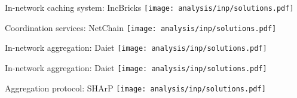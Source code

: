 \begin{frame}{In-network caching system: IncBricks}
    \centering
    \texttt{[image: analysis/inp/solutions.pdf]}
\end{frame}

\begin{frame}{Coordination services: NetChain}
    \centering
    \texttt{[image: analysis/inp/solutions.pdf]}
\end{frame}

\begin{frame}{In-network aggregation: Daiet}
    \centering
    \texttt{[image: analysis/inp/solutions.pdf]}
\end{frame}

\begin{frame}{In-network aggregation: Daiet}
    \centering
    \texttt{[image: analysis/inp/solutions.pdf]}
\end{frame}

\begin{frame}{Aggregation protocol: SHArP}
    \centering
    \texttt{[image: analysis/inp/solutions.pdf]}
\end{frame}


